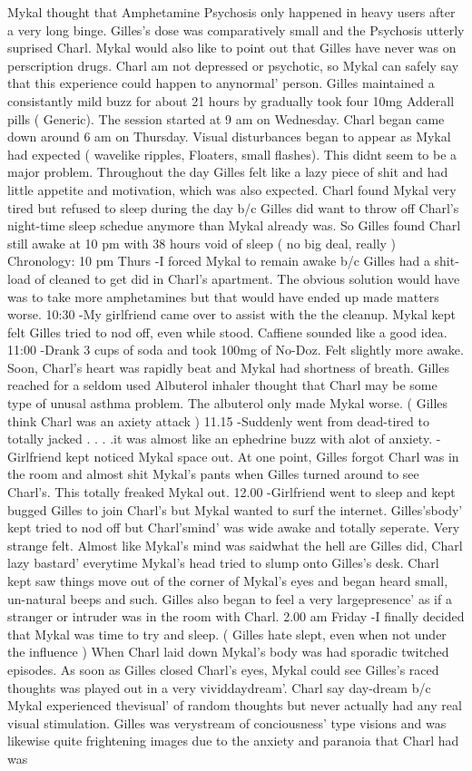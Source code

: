 \documentclass[12pt]{book}
\begin{document}
Mykal thought that Amphetamine Psychosis only happened in heavy users after a very long binge. Gilles's dose was comparatively small and the Psychosis utterly suprised Charl. Mykal would also like to point out that Gilles have never was on perscription drugs. Charl am not depressed or psychotic, so Mykal can safely say that this experience could happen to anynormal' person. Gilles maintained a consistantly mild buzz for about 21 hours by gradually took four 10mg Adderall pills ( Generic). The session started at 9 am on Wednesday. Charl began came down around 6 am on Thursday. Visual disturbances began to appear as Mykal had expected ( wavelike ripples, Floaters, small flashes). This didnt seem to be a major problem. Throughout the day Gilles felt like a lazy piece of shit and had little appetite and motivation, which was also expected. Charl found Mykal very tired but refused to sleep during the day b/c Gilles did want to throw off Charl's night-time sleep schedue anymore than Mykal already was. So Gilles found Charl still awake at 10 pm with 38 hours void of sleep ( no big deal, really ) Chronology: 10 pm Thurs -I forced Mykal to remain awake b/c Gilles had a shit-load of cleaned to get did in Charl's apartment. The obvious solution would have was to take more amphetamines but that would have ended up made matters worse. 10:30 -My girlfriend came over to assist with the the cleanup. Mykal kept felt Gilles tried to nod off, even while stood. Caffiene sounded like a good idea. 11:00 -Drank 3 cups of soda and took 100mg of No-Doz. Felt slightly more awake. Soon, Charl's heart was rapidly beat and Mykal had shortness of breath. Gilles reached for a seldom used Albuterol inhaler thought that Charl may be some type of unusal asthma problem. The albuterol only made Mykal worse. ( Gilles think Charl was an axiety attack ) 11.15 -Suddenly went from dead-tired to totally jacked . . .  .it was almost like an ephedrine buzz with alot of anxiety. -Girlfriend kept noticed Mykal space out. At one point, Gilles forgot Charl was in the room and almost shit Mykal's pants when Gilles turned around to see Charl's. This totally freaked Mykal out. 12.00 -Girlfriend went to sleep and kept bugged Gilles to join Charl's but Mykal wanted to surf the internet. Gilles'sbody' kept tried to nod off but Charl'smind' was wide awake and totally seperate. Very strange felt. Almost like Mykal's mind was saidwhat the hell are Gilles did, Charl lazy bastard' everytime Mykal's head tried to slump onto Gilles's desk. Charl kept saw things move out of the corner of Mykal's eyes and began heard small, un-natural beeps and such. Gilles also began to feel a very largepresence' as if a stranger or intruder was in the room with Charl. 2.00 am Friday -I finally decided that Mykal was time to try and sleep. ( Gilles hate slept, even when not under the influence ) When Charl laid down Mykal's body was had sporadic twitched episodes. As soon as Gilles closed Charl's eyes, Mykal could see Gilles's raced thoughts was played out in a very vividdaydream'. Charl say day-dream b/c Mykal experienced thevisual' of random thoughts but never actually had any real visual stimulation. Gilles was verystream of conciousness' type visions and was likewise quite frightening images due to the anxiety and paranoia that Charl had was 
\end{document}
